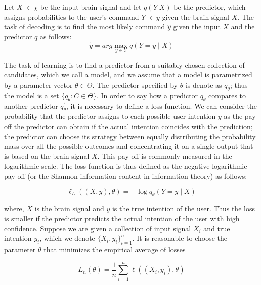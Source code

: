 Let $X$ $\in \chi$  be the input brain signal and let $q(Y|X)$ be the predictor, which assigns probabilities to the user's command $Y$ $\in y$ given the brain signal $X$. The task of decoding is to find the most likely command $\hat{y}$ given the input $X$ and the predictor $q$ as follows:
\begin{equation}
\tilde{y}=arg\max_{y\in Y} q\left(Y=y\mid X\right)
\end{equation}

The task of learning is to find a predictor from a suitably chosen collection of candidates, which we call a 
model, and we assume that a model is parametrized by a parameter vector $\theta \in \Theta$. The predictor 
specified by $\theta$ is denote as $q_\theta$; thus the model is a set $\lbrace q_\theta : C \in \Theta
\rbrace $. In order to say how a predictor $q_\theta$ compares to another predictor $q^{'}_{\theta}$, it is 
necessary to define a loss function. We can consider the probability that the predictor assigns to each 
possible user intention $y$ as the pay off the predictor can obtain if the actual intention coincides with 
the prediction; the predictor can choose its strategy between equally distributing the probability mass over 
all the possible outcomes and concentrating it on a single output that is based on the brain signal $X$. This 
pay off is commonly measured in the logarithmic scale. The loss function is thus defined as the negative 
logarithmic pay off (or the Shannon information content in information theory) as follows:

\begin{equation}
\ell_L\left(\left(X,y\right),\theta\right)=-\log q_\theta\left(Y=y\mid X\right)
\end{equation}

where, $X$ is the brain signal and $y$ is the true intention of the user. Thus the loss is smaller if the predictor predicts the actual intention of the user with high confidence. Suppose we are given a collection of input signal $X_i$ and true intention $y_i$, which we denote $\lbrace X_i,y_i\rbrace_{i=1}^n$. It is reasonable to choose the parameter $\theta$ that minimizes the empirical average of losses 

\begin{equation}
L_n\left(\theta\right)=\frac{1}{n}\sum_{i=1}^n\ell\left(\left(X_i,y_i\right),\theta\right)
\end{equation}

